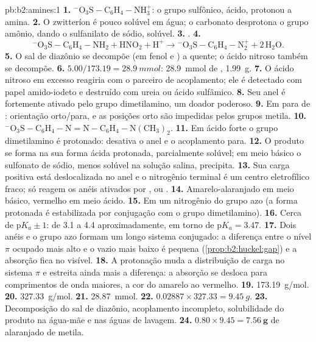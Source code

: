 \begin{solution}{pb:b2:amines:1}
\textbf{1.} $\mathrm{{}^-O_3S{-}C_6H_4{-}NH_3^+}$: o grupo sulfônico, ácido, protonou a amina.
\textbf{2.} O zwitteríon é pouco solúvel em água; o carbonato desprotona o grupo amônio,
dando o sulfanilato de sódio, solúvel.
\textbf{3.} .
\textbf{4.}
\[
  \mathrm{{}^-O_3S{-}C_6H_4{-}NH_2 + HNO_2 + H^+ \to {}^-O_3S{-}C_6H_4{-}N_2^+ + 2\,H_2O} .
\]
\textbf{5.} O sal de diazônio se decompõe (em fenol e ) a quente; o ácido nitroso
também se decompõe.
\textbf{6.} $5.00/173.19 = \qty{28.9}{mmol}$: \qty{28.9}{mmol} de , \qty{1.99}{g}.
\textbf{7.} O ácido nitroso em excesso reagiria com o parceiro de acoplamento; ele é detectado com papel
amido-iodeto e destruído com ureia ou ácido sulfâmico.
\textbf{8.} Seu anel é fortemente ativado pelo grupo dimetilamino, um doador poderoso.
\textbf{9.} Em para de : orientação orto/para, e as posições orto são impedidas pelos
grupos metila.
\textbf{10.} $\mathrm{{}^-O_3S{-}C_6H_4{-}N{=}N{-}C_6H_4{-}N(CH_3)_2}$.
\textbf{11.} Em ácido forte o grupo dimetilamino é protonado:  desativa o anel
e o acoplamento para.
\textbf{12.} O produto se forma na sua forma ácida protonada, parcialmente solúvel; em meio básico o
sulfonato de sódio, menos solúvel na solução salina, precipita.
\textbf{13.} Sua carga positiva está deslocalizada no anel e o nitrogênio terminal é um centro
eletrofílico fraco; só reagem os anéis ativados por ,  ou .
\textbf{14.} Amarelo-alaranjado em meio básico, vermelho em meio ácido.
\textbf{15.} Em um nitrogênio do grupo azo (a forma protonada é estabilizada por conjugação com
o grupo dimetilamino).
\textbf{16.} Cerca de $\mathrm pK_a \pm 1$: de 3.1 a 4.4 aproximadamente, em torno de $\mathrm pK_a = 3.47$.
\textbf{17.} Dois anéis e o grupo azo formam um longo sistema conjugado: a diferença entre o nível
$\pi$ ocupado mais alto e o vazio mais baixo é pequena (\cref{prop:b2:huckel:gap}) e a absorção
fica no visível.
\textbf{18.} A protonação muda a distribuição de carga no sistema $\pi$ e estreita ainda mais a
diferença: a absorção se desloca para comprimentos de onda maiores, a cor do amarelo ao vermelho.
\textbf{19.} \qty{173.19}{g/mol}.
\textbf{20.} \qty{327.33}{g/mol}.
\textbf{21.} \qty{28.87}{mmol}.
\textbf{22.} $0.02887 \times 327.33 = \qty{9.45}{g}$.
\textbf{23.} Decomposição do sal de diazônio, acoplamento incompleto, solubilidade do produto na
água-mãe e nas águas de lavagem.
\textbf{24.} $0.80 \times 9.45 = \boldsymbol{\qty{7.56}{g}}$ de alaranjado de metila.
\end{solution}
